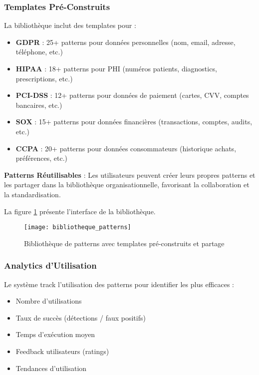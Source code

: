 \subsubsection{Templates Pré-Construits}

La bibliothèque inclut des templates pour :
\begin{itemize}
    \item \textbf{GDPR} : 25+ patterns pour données personnelles (nom, email, adresse, téléphone, etc.)
    \item \textbf{HIPAA} : 18+ patterns pour PHI (numéros patients, diagnostics, prescriptions, etc.)
    \item \textbf{PCI-DSS} : 12+ patterns pour données de paiement (cartes, CVV, comptes bancaires, etc.)
    \item \textbf{SOX} : 15+ patterns pour données financières (transactions, comptes, audits, etc.)
    \item \textbf{CCPA} : 20+ patterns pour données consommateurs (historique achats, préférences, etc.)
\end{itemize}

\textbf{Patterns Réutilisables} : Les utilisateurs peuvent créer leurs propres patterns et les partager dans la bibliothèque organisationnelle, favorisant la collaboration et la standardisation.

La figure \ref{fig:bibliotheque_patterns} présente l'interface de la bibliothèque.

\begin{figure}[htpb]
\centering
\texttt{[image: bibliotheque\_patterns]}
\caption{Bibliothèque de patterns avec templates pré-construits et partage}
\label{fig:bibliotheque_patterns}
\end{figure}

\subsubsection{Analytics d'Utilisation}

Le système track l'utilisation des patterns pour identifier les plus efficaces :
\begin{itemize}
    \item Nombre d'utilisations
    \item Taux de succès (détections / faux positifs)
    \item Temps d'exécution moyen
    \item Feedback utilisateurs (ratings)
    \item Tendances d'utilisation
\end{itemize}

